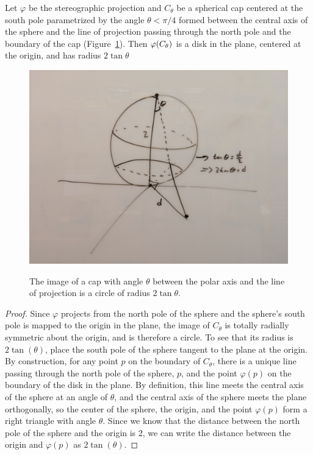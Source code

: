 \begin{lemma}
  Let $\varphi$ be the stereographic projection and $C_\theta$ be
  a spherical cap centered at the south pole parametrized by the angle
  $\theta <\pi/4$ formed between the central axis of the sphere and
  the line of projection passing through the north pole and the
  boundary of the cap (Figure~\ref{fig:stereocap}). Then
  $\varphi(C_\theta)$ is a disk in the plane, centered at the origin, and
  has radius $2\tan\theta$
\end{lemma}
\begin{figure}
  \centering
  \includegraphics[width=.8\textwidth]{figs/stereo_cap.jpg}\\
  \caption{ The image of a cap with angle $\theta$ between the polar axis and the line of projection is a circle of radius $2\tan\theta$.  }
  \label{fig:stereocap}
\end{figure}
\begin{proof}


  Since $\varphi$ projects from the north pole of the sphere and the
  sphere's south pole is mapped to the origin in the plane, the image
  of $C_\theta$ is totally radially symmetric about the origin, and is
  therefore a circle.  To see that its radius is $2\tan(\theta)$,
  place the south pole of the sphere tangent to the plane at the
  origin. By construction, for any point $p$ on the boundary of
  $C_\theta$, there is a unique line passing through the north pole of
  the sphere, $p$, and the point $\varphi(p)$ on the boundary of the
  disk in the plane.  By definition, this line meets the central axis
  of the sphere at an angle of $\theta$, and the central axis of the
  sphere meets the plane orthogonally, so the center of the sphere,
  the origin, and the point $\varphi(p)$ form a right triangle with
  angle $\theta$.  Since we know that the distance between the north
  pole of the sphere and the origin is 2, we can write the distance
  between the origin and $\varphi(p)$ as $2\tan(\theta)$.

\end{proof}

